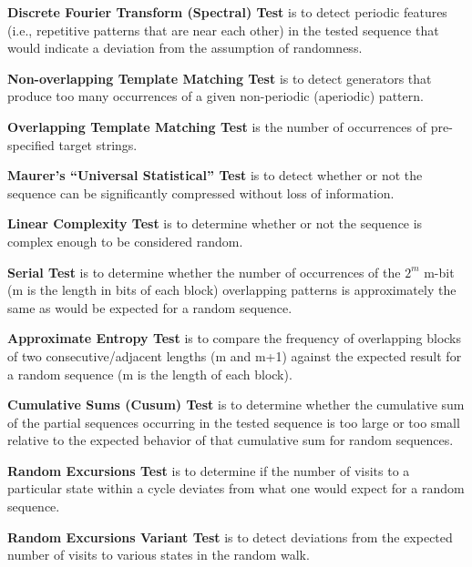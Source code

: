 \documentclass[journal]{IEEEtran}
\begin{document}
\textbf{Discrete Fourier Transform (Spectral) Test} is to detect periodic features (i.e., repetitive patterns that are near each other) in the tested sequence that would indicate a deviation from the assumption of randomness.


\textbf{Non-overlapping Template Matching Test} is to detect generators that produce too many occurrences of a given non-periodic (aperiodic) pattern.


\textbf{Overlapping Template Matching Test} is the number of occurrences of pre-specified target strings.


\textbf{Maurer's ``Universal Statistical'' Test} is to detect whether or not the sequence can be
significantly compressed without loss of information.


\textbf{Linear Complexity Test} is to determine whether or not the sequence is complex enough to be considered random.


\textbf{Serial Test} is to determine whether the number of occurrences of the $2^{m}$ m-bit (m is the length in bits of each block) overlapping patterns is approximately the same as would be expected for a random sequence.


\textbf{Approximate Entropy Test} is to compare the frequency of overlapping blocks of two consecutive/adjacent lengths (m and m+1) against the expected result for a random sequence (m is the length of each block).


\textbf{Cumulative Sums (Cusum) Test} is to determine whether the cumulative sum of the partial sequences occurring in the tested sequence is too large or too small relative to the expected behavior of that cumulative sum for random sequences.


\textbf{Random Excursions Test} is to determine if the number of visits to a particular state within a cycle deviates from what one would expect for a random sequence.


\textbf{Random Excursions Variant Test} is to detect deviations from the expected number of visits to various states in the random walk.
\end{document}

